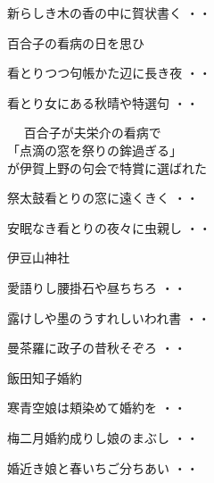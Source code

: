 \vspace{0.6cm}
\begin{shiika}新らしき木の香の中に賀状書く
\hfill{・・}\end{shiika}
\vspace{0.6cm}
百合子の看病の日を思ひ
\begin{shiika}看とりつつ句帳かた辺に長き夜
\hfill{・・}\end{shiika}
\begin{shiika}看とり女にある秋晴や特選句
\hfill{・・}\end{shiika}
\qquad\qquad\qquad{}　
 百合子が夫栄介の看病で\\
\qquad\qquad\qquad「点滴の窓を祭りの鉾過ぎる」\\
\qquad\qquad\qquad が伊賀上野の句会で特賞に選ばれた\\
\begin{shiika}祭太鼓看とりの窓に遠くきく
\hfill{・・}\end{shiika}
\begin{shiika}安眠なき看とりの夜々に虫親し
\hfill{・・}\end{shiika}
\vspace{0.6cm}
伊豆山神社
\begin{shiika}愛語りし腰掛石や昼ちちろ
\hfill{・・}\end{shiika}
\begin{shiika}露けしや墨のうすれしいわれ書
\hfill{・・}\end{shiika}
\begin{shiika}曼茶羅に政子の昔秋そぞろ
\hfill{・・}\end{shiika}
\vspace{0.6cm}
飯田知子婚約
\begin{shiika}寒青空娘は頬染めて婚約を
\hfill{・・}\end{shiika}
\begin{shiika}梅二月婚約成りし娘のまぶし
\hfill{・・}\end{shiika}
\begin{shiika}婚近き娘と春いちご分ちあい
\hfill{・・}\end{shiika}
\vspace{0.6cm}
